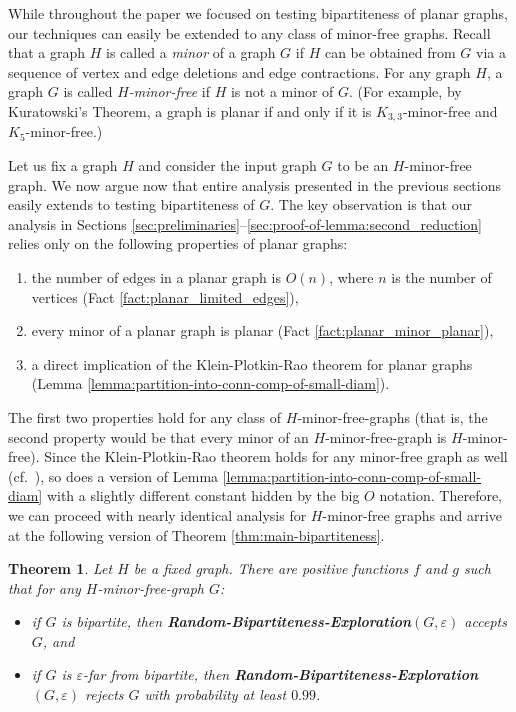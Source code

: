 \documentclass[11pt]{article}
\newtheorem{theorem}{Theorem}
\newcommand{\eps}{\ensuremath{\epsilon}}
\def\epsilon{\ensuremath{\varepsilon}}
\newcommand{\RBE}{{\bf Random-Bipartiteness-Exploration}}
\begin{document}
While throughout the paper we focused on testing bipartiteness of planar graphs, our techniques can easily be extended to any class of minor-free graphs. Recall that a graph $H$ is called a \emph{minor} of a graph $G$ if $H$ can be obtained from $G$ via  a sequence of vertex and edge deletions and edge contractions. For any graph $H$, a graph $G$ is called \emph{$H$-minor-free} if $H$ is not a minor of $G$. (For example, by Kuratowski's Theorem, a graph is planar if and only if it is $K_{3,3}$-minor-free and $K_5$-minor-free.)

Let us fix a graph $H$ and consider the input graph $G$ to be an $H$-minor-free graph. We now argue now that entire analysis presented in the previous sections easily extends to testing bipartiteness of $G$. The key observation is that our analysis in Sections \ref{sec:preliminaries}--\ref{sec:proof-of-lemma:second_reduction} relies only on the following properties of planar graphs:
\begin{enumerate}[\it (i)]
\item the number of edges in a planar graph is $O(n)$, where $n$ is the number of vertices (Fact \ref{fact:planar_limited_edges}),
\item every minor of a planar graph is planar (Fact \ref{fact:planar_minor_planar}),
\item a direct implication of the Klein-Plotkin-Rao theorem for planar graphs (Lemma \ref{lemma:partition-into-conn-comp-of-small-diam}).
\end{enumerate}
The first two properties hold for any class of $H$-minor-free-graphs (that is, the second property would be that every minor of an $H$-minor-free-graph is $H$-minor-free). Since the Klein-Plotkin-Rao theorem holds for any minor-free graph as well (cf.~\cite{KPR93}), so does a version of Lemma \ref{lemma:partition-into-conn-comp-of-small-diam} with a slightly different constant hidden by the big $O$ notation. Therefore, we can proceed with nearly identical  analysis for $H$-minor-free graphs and arrive at the following version of Theorem \ref{thm:main-bipartiteness}.

\begin{theorem}
\label{thm:main-bipartiteness-minor-free}
Let $H$ be a fixed graph. There are positive functions $f$ and $g$ such that for any $H$-minor-free-graph $G$:
\begin{itemize}
\item if $G$ is bipartite, then \RBE$(G,\eps)$ accepts $G$, and
\item if $G$ is $\eps$-far from bipartite, then \RBE$(G,\eps)$ rejects $G$ with probability at least $0.99$.
\end{itemize}
\end{theorem}
\end{document}
